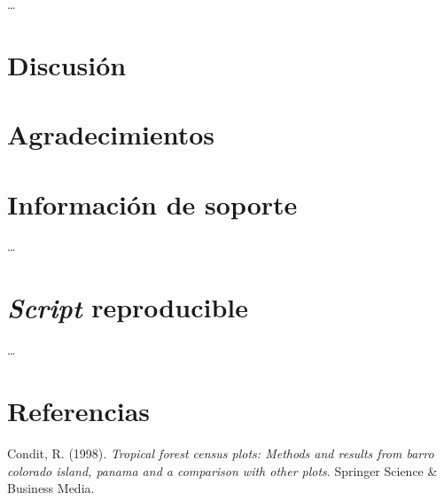 \documentclass[11pt,]{article}
\begin{document}
\ldots

\section{Discusión}\label{discusiuxf3n}

\section{Agradecimientos}\label{agradecimientos}

\section{Información de soporte}\label{informaciuxf3n-de-soporte}

\ldots

\section{\texorpdfstring{\emph{Script}
reproducible}{Script reproducible}}\label{script-reproducible}

\ldots

\section*{Referencias}\label{referencias}

\hypertarget{refs}{}
\hypertarget{ref-condit1998tropical}{}
Condit, R. (1998). \emph{Tropical forest census plots: Methods and
results from barro colorado island, panama and a comparison with other
plots}. Springer Science \& Business Media.




\newpage
\singlespacing 
\end{document}
